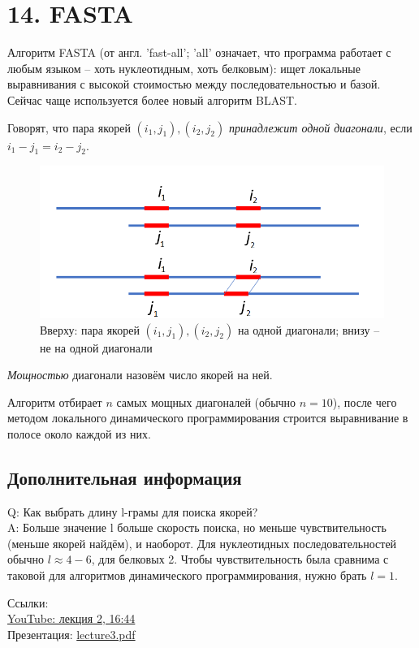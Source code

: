 \documentclass[a4paper,12pt]{article} %
\begin{document}
	
\section{14. FASTA}
Алгоритм FASTA (от англ. 'fast-all'; 'all' означает, что программа работает с любым языком -- хоть нуклеотидным, хоть белковым): ищет локальные выравнивания с высокой стоимостью между последовательностью и базой. Сейчас чаще используется более новый алгоритм BLAST.

Говорят, что пара якорей $(i_1,j_1), (i_2, j_2)$ \textit{принадлежит одной диагонали}, если $i_1-j_1=i_2-j_2$.

\begin{figure}[H]
	\centering \includegraphics[width=.6\textwidth]{seeds}
	\caption{Вверху: пара якорей $(i_1,j_1), (i_2, j_2)$ на одной диагонали; внизу -- не на одной диагонали}
\end{figure}

\textit{Мощностью} диагонали назовём число якорей на ней.

Алгоритм отбирает $n$ самых мощных диагоналей (обычно $n=10$), после чего методом локального динамического программирования строится выравнивание в полосе около каждой из них.

\subsection{Дополнительная информация}
Q: Как выбрать длину l-грамы для поиска якорей? \\
A: Больше значение l \textrightarrow больше скорость поиска, но меньше чувствительность (меньше якорей найдём), и наоборот. Для нуклеотидных последовательностей обычно $l \approx 4-6$, для белковых 2. Чтобы чувствительность была сравнима с таковой для алгоритмов динамического программирования, нужно брать $l=1$.

Ссылки:\\
\href{https://www.youtube.com/watch?v=gGoYQBBEX8M&list=PLvJPYisgz4MDD0mcjf9HBu9OX-gb-7WZc&t=1004s}{YouTube: лекция 2, 16:44}\\
Презентация: \href{https://vk.com/doc155237002_519204981?hash=85ffc7a5b3eb31882d}{lecture3.pdf}
\end{document}
